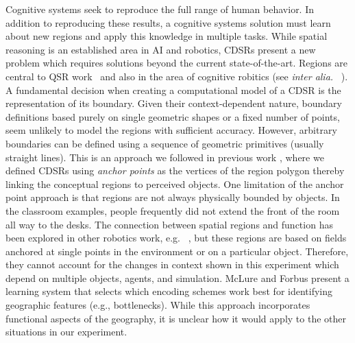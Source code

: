 \documentclass[11pt,letterpaper]{article}
\begin{document}
Cognitive systems seek to reproduce the full range of human behavior.  In addition to reproducing these results, a cognitive systems solution must learn about new regions and apply this knowledge in multiple tasks.  While spatial reasoning is an established area in AI and robotics, CDSRs present a new problem which requires solutions beyond the current state-of-the-art. Regions are central to QSR work~\cite{Cohn:2001} and also in the area of cognitive robitics (see \emph{inter alia.} ~\cite{brenneretal07ijcai,kelleher/costello:09}). A fundamental decision when creating a computational model of a CDSR is the representation of its boundary. Given their context-dependent nature, boundary definitions based purely on single geometric shapes or a fixed number of points, seem unlikely to model the regions with sufficient accuracy. However, arbitrary boundaries can be defined using a sequence of geometric primitives (usually straight lines). This is an approach we followed in previous work \cite{Hawes:2012}, where we defined CDSRs using \textit{anchor points} as the vertices of the region polygon thereby linking the conceptual regions to perceived objects. One limitation of the anchor point approach is that regions are not always physically bounded by objects.  In the classroom examples, people frequently did not extend the front of the room all way to the desks. The connection between spatial regions and function has been explored in other robotics work, e.g. ~\cite{Karg:2012,Fasola:2013}, but these regions are based on fields anchored at single points in the environment or on a particular object. Therefore, they cannot account for the changes in context shown in this experiment which depend on multiple objects, agents, and simulation.  McLure and Forbus \cite{McLureForbus:2012} present a learning system that selects which encoding schemes work best for identifying geographic features (e.g., bottlenecks).  While this approach incorporates functional aspects of the geography, it is unclear how it would apply to the other situations in our experiment.  




\end{document}
